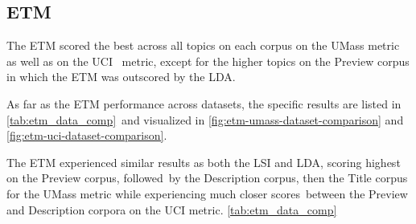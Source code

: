 \documentclass[letterpaper,12pt]{article}
\begin{document}
\subsection{ETM}
The ETM scored the best across all topics on each corpus on the UMass metric as well as on the UCI \
metric, except for the higher topics on the Preview corpus in which the ETM was outscored by the LDA.

As far as the ETM performance across datasets, the specific results are listed in \ref{tab:etm_data_comp}\
and visualized in \ref{fig:etm-umass-dataset-comparison} and \ref{fig:etm-uci-dataset-comparison}.

The ETM experienced similar results as both the LSI and LDA, scoring highest on the Preview corpus, followed\
by the Description corpus, then the Title corpus for the UMass metric while experiencing much closer scores\
between the Preview and Description corpora on the UCI metric.
\ref{tab:etm_data_comp}
\end{document}
